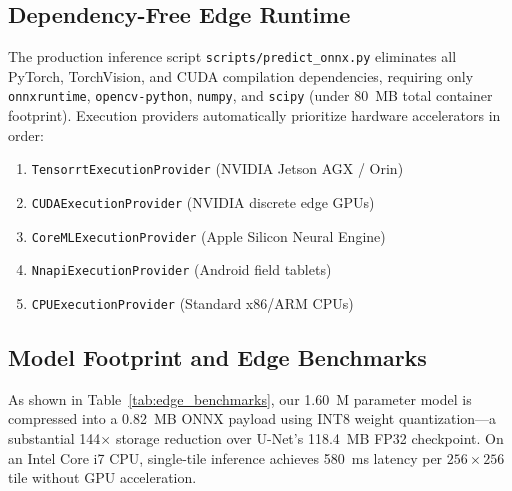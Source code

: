 \documentclass[conference]{IEEEtran}
\begin{document}
\subsection{Dependency-Free Edge Runtime}
The production inference script \texttt{scripts/predict\_onnx.py} eliminates all PyTorch, TorchVision, and CUDA compilation dependencies, requiring only \texttt{onnxruntime}, \texttt{opencv-python}, \texttt{numpy}, and \texttt{scipy} (under 80~MB total container footprint). Execution providers automatically prioritize hardware accelerators in order:
\begin{enumerate}
    \item \texttt{TensorrtExecutionProvider} (NVIDIA Jetson AGX / Orin)
    \item \texttt{CUDAExecutionProvider} (NVIDIA discrete edge GPUs)
    \item \texttt{CoreMLExecutionProvider} (Apple Silicon Neural Engine)
    \item \texttt{NnapiExecutionProvider} (Android field tablets)
    \item \texttt{CPUExecutionProvider} (Standard x86/ARM CPUs)
\end{enumerate}

\subsection{Model Footprint and Edge Benchmarks}
As shown in Table~\ref{tab:edge_benchmarks}, our 1.60~M parameter model is compressed into a 0.82~MB ONNX payload using INT8 weight quantization—a substantial 144$\times$ storage reduction over U-Net's 118.4~MB FP32 checkpoint. On an Intel Core i7 CPU, single-tile inference achieves 580~ms latency per $256 \times 256$ tile without GPU acceleration.

\begin{table}[t]
\centering
\caption{Edge Model Footprint, Storage, and Inference Latency Benchmarks (Input: $1\times3\times256\times256$)}
\label{tab:edge_benchmarks}
\end{table}
\end{document}
